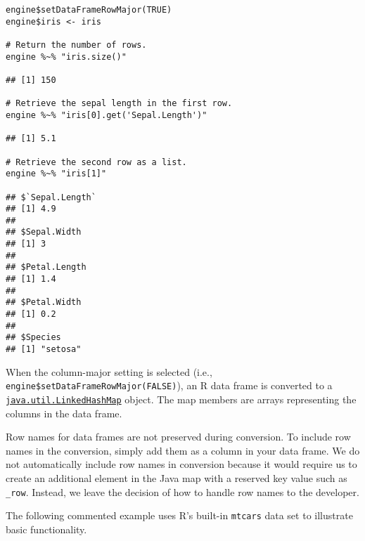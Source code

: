\documentclass[
article,
11pt, %
a4paper, %
oneside, %
headinclude,footinclude, %
]{scrartcl}
\theoremstyle{definition} %
\theoremstyle{plain} %
\theoremstyle{remark} %
\newcommand{\code}[1]{\texttt{#1}}
\begin{document}
\begin{verbatim}
engine$setDataFrameRowMajor(TRUE)
engine$iris <- iris

# Return the number of rows.
engine %~% "iris.size()"

## [1] 150

# Retrieve the sepal length in the first row.
engine %~% "iris[0].get('Sepal.Length')"

## [1] 5.1

# Retrieve the second row as a list.
engine %~% "iris[1]"

## $`Sepal.Length`
## [1] 4.9
##
## $Sepal.Width
## [1] 3
##
## $Petal.Length
## [1] 1.4
##
## $Petal.Width
## [1] 0.2
##
## $Species
## [1] "setosa"
\end{verbatim}

When the column-major setting is selected (i.e., \code{engine\$setDataFrameRowMajor(FALSE)}), an R data frame is converted to a \href{https://docs.oracle.com/javase/8/docs/api/java/util/LinkedHashMap.html}{\code{java.util.LinkedHashMap}} object. The map members are arrays representing the columns in the data frame.

Row names for data frames are not preserved during conversion. To include row names in the conversion, simply add them as a column in your data frame. We do not automatically include row names in conversion because it would require us to create an additional element in the Java map with a reserved key value such as \code{\_row}. Instead, we leave the decision of how to handle row names to the developer.

The following commented example uses R's built-in \code{mtcars} data set to illustrate basic functionality.
\end{document}
